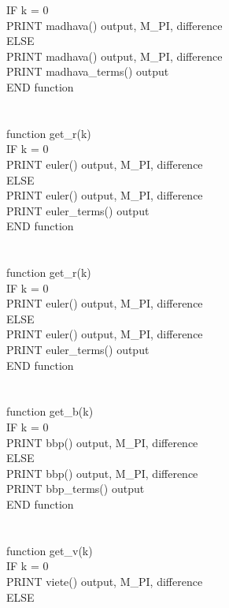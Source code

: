 \documentclass[12pt]{article}
\begin{document}
\indent IF k = 0 \\
\indent \indent PRINT madhava() output, M\_PI, difference \\
\indent ELSE \\
\indent \indent PRINT madhava() output, M\_PI, difference \\
\indent \indent PRINT madhava\_terms() output \\
END function \\
\\
\\
function get\_r(k) \\
\indent IF k = 0 \\
\indent \indent PRINT euler() output, M\_PI, difference \\
\indent ELSE \\
\indent \indent PRINT euler() output, M\_PI, difference \\
\indent \indent PRINT euler\_terms() output \\
END function \\
\\
\\
function get\_r(k) \\
\indent IF k = 0 \\
\indent \indent PRINT euler() output, M\_PI, difference \\
\indent ELSE \\
\indent \indent PRINT euler() output, M\_PI, difference \\
\indent \indent PRINT euler\_terms() output \\
END function \\
\\
\\
function get\_b(k) \\
\indent IF k = 0 \\
\indent \indent PRINT bbp() output, M\_PI, difference \\
\indent ELSE \\
\indent \indent PRINT bbp() output, M\_PI, difference \\
\indent \indent PRINT bbp\_terms() output \\
END function \\
\\
\\
function get\_v(k) \\
\indent IF k = 0 \\
\indent \indent PRINT viete() output, M\_PI, difference \\
\indent ELSE \\
\end{document}
